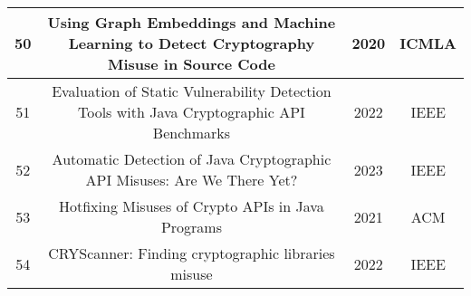 \begin{table*}
\begin{tabular}{ |c|c|c|c| }
    \hline
    50 & Using Graph Embeddings and Machine Learning to Detect Cryptography Misuse in Source Code \cite{Rodrigues_Braga_Dahab_2020} & 2020 & ICMLA \\
    \hline
    51 & Evaluation of Static Vulnerability Detection Tools with Java Cryptographic API Benchmarks \cite{Afrose_Xiao_Rahaman_Miller_Yao_2022} & 2022 & IEEE \\
    \hline
    52 & Automatic Detection of Java Cryptographic API Misuses: Are We There Yet? \cite{Zhang_Kabir_Xiao_Yao_Meng_2023} & 2023 & IEEE \\
    \hline
    53 & Hotfixing Misuses of Crypto APIs in Java Programs \cite{Newbury_Ali_Craik_2021} & 2021 & ACM \\
    \hline
    54 & CRYScanner: Finding cryptographic libraries misuse \cite{Choudhari_Guilley_Karray} & 2022 & IEEE \\
    \hline
    \end{tabular}
    \end{table*}